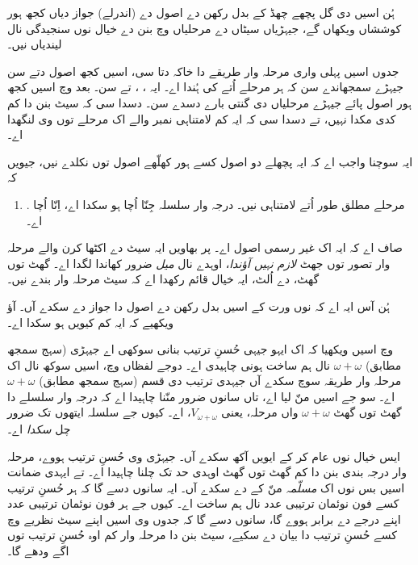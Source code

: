 \documentclass[../../../include/open-logic-section]{subfiles}
\begin{document}

ہُن اسیں \limofsize{} دی گل پچھے چھڈ کے بدل رکھن دے اصول دے (اندرلے) جواز دیاں کجھ ہور کوششاں ویکھاں گے، جیہڑیاں سیٹاں دے مرحلیاں وچ بنن دے خیال نوں سنجیدگی نال لیندیاں نیں۔

جدوں اسیں پہلی واری مرحلہ وار طریقے دا خاکہ دتا سی، اسیں کجھ اصول دتے سن جیہڑے سمجھاندے سن کہ ہر مرحلے اُتے کی ہُندا اے۔ ایہ \stageshier، \stagesord، تے \stagesacc سن۔ بعد وچ اسیں کجھ ہور اصول پائے جیہڑے مرحلیاں دی گنتی بارے دسدے سن۔ \stagessucc{} دسدا سی کہ سیٹ بنن دا کم کدی مکدا نہیں، تے \stagesinf{} دسدا سی کہ ایہ کم لامتناہی نمبر والے اک مرحلے توں وی لنگھدا اے۔

ایہ سوچنا واجب اے کہ ایہ پچھلے دو اصول کسے ہور کھلّھے اصول توں نکلدے نیں، جیویں کہ
\begin{enumerate}
	\item[] \stagesinex. مرحلے مطلق طور اُتے لامتناہی نیں۔ درجہ وار سلسلہ جِنّا اُچا ہو سکدا اے، اِنّا اُچا اے۔
\end{enumerate}
صاف اے کہ ایہ اک غیر رسمی اصول اے۔ پر بھاویں ایہ سیٹ دے اکٹھا کرن والے مرحلہ وار تصور توں جھٹ \emph{لازم نہیں آؤندا}، اوہدے نال \emph{میل} ضرور کھاندا لگدا اے۔ گھٹ توں گھٹ، \limofsize دے اُلٹ، ایہ خیال قائم رکھدا اے کہ سیٹ مرحلہ وار بندے نیں۔

ہُن آس ایہ اے کہ \stagesinex{} نوں ورت کے اسیں بدل رکھن دے اصول دا جواز دے سکدے آں۔ آؤ ویکھیے کہ ایہ کم کیویں ہو سکدا اے۔

 وچ اسیں ویکھیا کہ اک ایہو جیہی حُسنِ ترتیب بنانی سوکھی اے جیہڑی (سہج سمجھ مطابق) $\omega+\omega$ نال ہم ساخت ہونی چاہیدی اے۔ دوجے لفظاں وچ، اسیں سوکھ نال اک مرحلہ وار طریقہ سوچ سکدے آں جیہدی ترتیب دی قسم (سہج سمجھ مطابق) $\omega+\omega$ اے۔ سو جے اسیں \stagesinex منّ لیا اے، تاں سانوں ضرور منّنا چاہیدا اے کہ درجہ وار سلسلے دا گھٹ توں گھٹ $\omega+\omega$ واں مرحلہ، یعنی $V_{\omega+\omega}$، اے۔ کیوں جے سلسلہ ایتھوں تک ضرور چل \emph{سکدا} اے۔

ایس خیال نوں عام کر کے ایویں آکھ سکدے آں۔ جیہڑی وی حُسنِ ترتیب ہووے، مرحلہ وار درجہ بندی بنن دا کم گھٹ توں گھٹ اوہدی حد تک چلنا چاہیدا اے۔ تے ایہدی ضمانت اسیں بس  نوں اک \emph{مسلّمہ} منّ کے دے سکدے آں۔ ایہ سانوں دسے گا کہ ہر حُسنِ ترتیب کسے فون نوئمان ترتیبی عدد نال ہم ساخت اے۔ کیوں جے ہر فون نوئمان ترتیبی عدد اپنے درجے دے برابر ہووے گا،  سانوں دسے گا کہ جدوں وی اسیں اپنے سیٹ نظریے وچ کسے حُسنِ ترتیب دا بیان دے سکیے، سیٹ بنن دا مرحلہ وار کم اوہ حُسنِ ترتیب توں اگے ودھے گا۔
\end{document}
